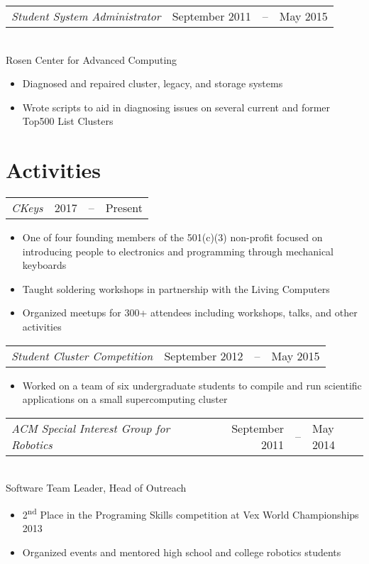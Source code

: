 \documentclass[line,margin]{res}
\begin{document}
\begin{resume}
    \begin{tabular}{@{} p{} r c l @{}}
      {\sl Student System Administrator\/} \hfill & September 2011 & -- & May 2015 %
    \end{tabular} \\
      Rosen Center for Advanced Computing
      \begin{itemize}
	\setlength{\itemsep}{-2pt}
        \item Diagnosed and repaired cluster, legacy, and storage systems
        \item Wrote scripts to aid in diagnosing issues on several current and former Top500 List Clusters
      \end{itemize}

  \section{\textcolor{TealBlue}{Activities}}
    \begin{tabular}{@{} p{} r c l @{}}
	    {\sl CKeys\/} & 2017 & -- & Present %
    \end{tabular}
      \begin{itemize}
	\setlength{\itemsep}{-2pt}
        \item One of four founding members of the 501(c)(3) non-profit focused on introducing people to electronics and programming through mechanical keyboards %
        \item Taught soldering workshops in partnership with the Living Computers
        \item Organized meetups for 300+ attendees including workshops, talks, and other activities
      \end{itemize}

    \begin{tabular}{@{} p{} r c l @{}}
	    {\sl Student Cluster Competition\/} & September 2012 & -- & May 2015 %
    \end{tabular}
      \begin{itemize}
	\setlength{\itemsep}{-2pt}
        \item Worked on a team of six undergraduate students to compile and run scientific applications on a small supercomputing cluster
      \end{itemize}
  
    \begin{tabular}{@{} p{} r c l @{}}
	    {\sl ACM Special Interest Group for Robotics\/} & September 2011 & -- & May 2014 \\%
    \end{tabular} \\
      Software Team Leader, Head of Outreach
      \begin{itemize}
	\setlength{\itemsep}{-2pt}
        \item 2\textsuperscript{nd} Place in the Programing Skills competition at Vex World Championships 2013
        \item Organized events and mentored high school and college robotics students
      \end{itemize}
    

\end{resume}
\end{document}
